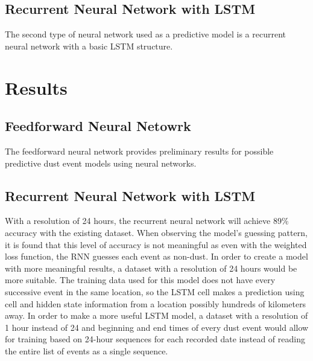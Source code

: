 \documentclass{article}
\begin{document}
\subsection{Recurrent Neural Network with LSTM}
The second type of neural network used as a predictive model is a recurrent neural network with a basic LSTM structure.
\section{Results}
\subsection{Feedforward Neural Netowrk}
The feedforward neural network provides preliminary results for possible predictive dust event models using neural networks. 
\subsection{Recurrent Neural Network with LSTM}
With a resolution of 24 hours, the recurrent neural network will achieve 89\% accuracy with the existing dataset. When observing the model's guessing pattern, it is found that this level of accuracy is not meaningful as even with the weighted loss function, the RNN guesses each event as non-dust. In order to create a model with more meaningful results, a dataset with a resolution of 24 hours would be more suitable. The training data used for this model does not have every successive event in the same location, so the LSTM cell makes a prediction using cell and hidden state information from a location possibly hundreds of kilometers away. In order to make a more useful LSTM model, a dataset with a resolution of 1 hour instead of 24 and beginning and end times of every dust event would allow for training based on 24-hour sequences for each recorded date instead of reading the entire list of events as a single sequence.
\end{document}
